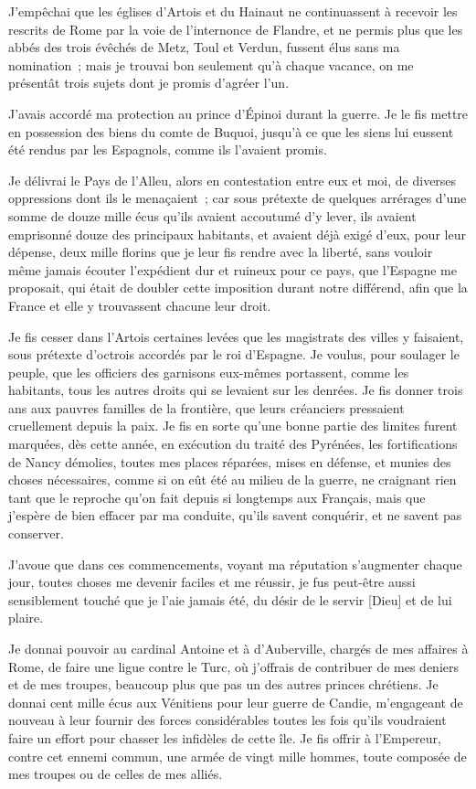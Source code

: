 \documentclass[french,twoside]{book} %
\begin{document}
J’empêchai que les églises d’Artois et du Hainaut ne continuassent à recevoir les rescrits de Rome par la voie de l’internonce de Flandre, et ne permis plus que les abbés des trois évêchés de Metz, Toul et Verdun, fussent élus sans ma nomination ; mais je trouvai bon seulement qu’à chaque vacance, on me présentât trois sujets dont je promis d’agréer l’un.\par
J’avais accordé ma protection au prince d’Épinoi durant la guerre. Je le fis mettre en possession des biens du comte de Buquoi, jusqu’à ce que les siens lui eussent été rendus par les Espagnols, comme ils l’avaient promis.\par
Je délivrai le Pays de l’Alleu, alors en contestation entre eux et moi, de diverses oppressions dont ils le menaçaient ; car sous prétexte de quelques arrérages d’une somme de douze mille écus qu’ils avaient accoutumé d’y lever, ils avaient emprisonné douze des principaux habitants, et avaient déjà exigé d’eux, pour leur dépense, deux mille florins que je leur fis rendre avec la liberté, sans vouloir même jamais écouter l’expédient dur et ruineux pour ce pays, que l’Espagne me proposait, qui était de doubler cette imposition durant notre différend, afin que la France et elle y trouvassent chacune leur droit.\par
Je fis cesser dans l’Artois certaines levées que les magistrats des villes y faisaient, sous prétexte d’octrois accordés par le roi d’Espagne. Je voulus, pour soulager le peuple, que les officiers des garnisons eux-mêmes portassent, comme les habitants, tous les autres droits qui se levaient sur les denrées. Je fis donner trois ans aux pauvres familles de la frontière, que leurs créanciers pressaient cruellement depuis la paix. Je fis en sorte qu’une bonne partie des limites furent marquées, dès cette année, en exécution du traité des Pyrénées, les fortifications de Nancy démolies, toutes mes places réparées, mises en défense, et munies des choses nécessaires, comme si on eût été au milieu de la guerre, ne craignant rien tant que le reproche qu’on fait depuis si longtemps aux Français, mais que j’espère de bien effacer par ma conduite, qu’ils savent conquérir, et ne savent pas conserver.\par
J’avoue que dans ces commencements, voyant ma réputation s’augmenter chaque jour, toutes choses me devenir faciles et me réussir, je fus peut-être aussi sensiblement touché que je l’aie jamais été, du désir de le servir [Dieu] et de lui plaire.\par
Je donnai pouvoir au cardinal Antoine et à d’Auberville, chargés de mes affaires à Rome, de faire une ligue contre le Turc, où j’offrais de contribuer de mes deniers et de mes troupes, beaucoup plus que pas un des autres princes chrétiens. Je donnai cent mille écus aux Vénitiens pour leur guerre de Candie, m’engageant de nouveau à leur fournir des forces considérables toutes les fois qu’ils voudraient faire un effort pour chasser les infidèles de cette île. Je fis offrir à l’Empereur, contre cet ennemi commun, une armée de vingt mille hommes, toute composée de mes troupes ou de celles de mes alliés.\par
\end{document}
